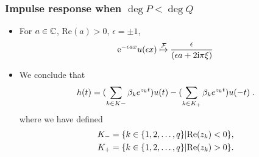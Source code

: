 \begin{frame}
\frametitle{Impulse response when $\deg P<\deg Q$}
\begin{itemize}
\item For $a \in \mathbb{C}$, $\mathrm{Re}(a) > 0$, $\epsilon= \pm 1$,
\[
\mathrm{e}^{-\epsilon a x} u(\epsilon x) \stackrel{\mathcal{F}}{\mapsto} \frac{\epsilon}{(\epsilon a + 2 \mathrm{i} \pi \xi)}
\]
\item We conclude that
$$
h(t)=(\sum_{k\in K-}\beta_{k}e^{z_{k}t})u(t)-(\sum_{k\in K_{+}}\beta_{k}e^{z_{k}t})u(-t) \;.
$$
where we have defined
\begin{align*}
K_{-} &=\{k\in\{1,2,\ldots,q\}|{\rm Re}(z_{k})<0\}, \\
K_{+} &=\{k\in\{1,2,\ldots,q\}|{\rm Re}(z_{k})>0\}.
\end{align*}
\end{itemize}
\end{frame}

 